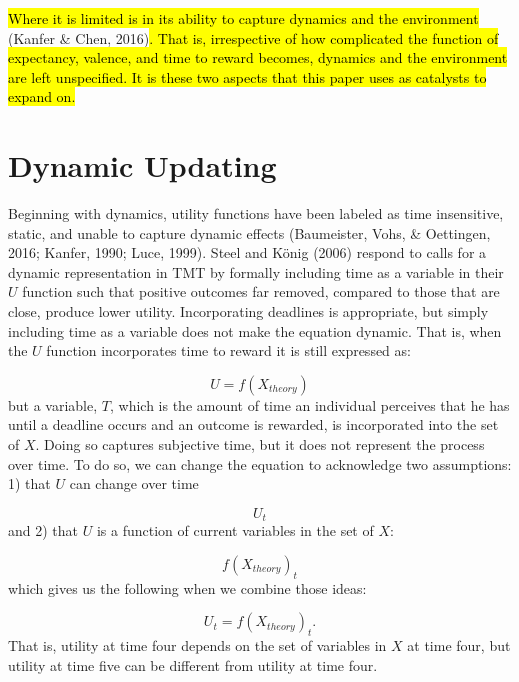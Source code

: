 \documentclass[english,,man]{apa6}
\theoremstyle{definition}
\theoremstyle{definition}
\theoremstyle{definition}
\theoremstyle{remark}
\begin{document}
\hl{Where it is limited is in its ability to capture dynamics and the environment }(Kanfer
\& Chen,
2016)\hl{. That is, irrespective of how complicated the function of expectancy, valence, and time to reward becomes, dynamics and the environment are left unspecified. It is these two aspects that this paper uses as catalysts to expand on. }

\hypertarget{dynamic-updating}{%
\section{Dynamic Updating}\label{dynamic-updating}}

Beginning with dynamics, utility functions have been labeled as time
insensitive, static, and unable to capture dynamic effects (Baumeister,
Vohs, \& Oettingen, 2016; Kanfer, 1990; Luce, 1999). Steel and König
(2006) respond to calls for a dynamic representation in TMT by formally
including time as a variable in their \(U\) function such that positive
outcomes far removed, compared to those that are close, produce lower
utility. Incorporating deadlines is appropriate, but simply including
time as a variable does not make the equation dynamic. That is, when the
\(U\) function incorporates time to reward it is still expressed as:

\begin{equation}
U = f(X_{theory})
\end{equation} \noindent but a variable, \(T\), which is the amount of
time an individual perceives that he has until a deadline occurs and an
outcome is rewarded, is incorporated into the set of \(X\). Doing so
captures subjective time, but it does not represent the process over
time. To do so, we can change the equation to acknowledge two
assumptions: 1) that \(U\) can change over time

\begin{equation}
U_{t}
\end{equation} \noindent and 2) that \(U\) is a function of current
variables in the set of \(X\):

\begin{equation}
f(X_{theory})_{t}
\end{equation} \noindent which gives us the following when we combine
those ideas:

\begin{equation}
U_{t} = f(X_{theory})_{t}.
\end{equation} \noindent That is, utility at time four depends on the
set of variables in \(X\) at time four, but utility at time five can be
different from utility at time four.
\end{document}
